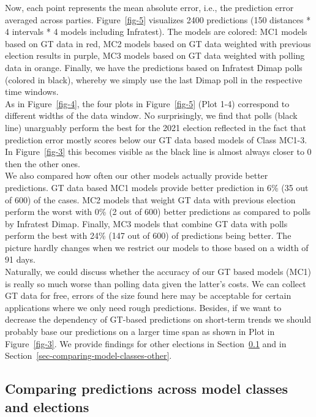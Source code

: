 \documentclass[
  letterpaper,
  DIV=11,
  numbers=noendperiod]{scrartcl}
\begin{document}
Now, each point represents the mean absolute error, i.e., the prediction
error averaged across parties. Figure~\ref{fig-5} visualizes 2400
predictions (150 distances * 4 intervals * 4 models including
Infratest). The models are colored: MC1 models based on GT data in red,
MC2 models based on GT data weighted with previous election results in
purple, MC3 models based on GT data weighted with polling data in
orange. Finally, we have the predictions based on Infratest Dimap polls
(colored in black), whereby we simply use the last Dimap poll in the
respective time windows.\\
As in Figure~\ref{fig-4}, the four plots in Figure~\ref{fig-5} (Plot
1-4) correspond to different widths of the data window. No surprisingly,
we find that polls (black line) unarguably perform the best for the 2021
election reflected in the fact that prediction error mostly scores below
our GT data based models of Class MC1-3. In Figure~\ref{fig-3} this
becomes visible as the black line is almost always closer to 0 then the
other ones.\\
We also compared how often our other models actually provide better
predictions. GT data based MC1 models provide better prediction in 6\%
(35 out of 600) of the cases. MC2 models that weight GT data with
previous election perform the worst with 0\% (2 out of 600) better
predictions as compared to polls by Infratest Dimap. Finally, MC3 models
that combine GT data with polls perform the best with 24\% (147 out of
600) of predictions being better. The picture hardly changes when we
restrict our models to those based on a width of 91 days.\\
Naturally, we could discuss whether the accuracy of our GT based models
(MC1) is really so much worse than polling data given the latter's
costs. We can collect GT data for free, errors of the size found here
may be acceptable for certain applications where we only need rough
predictions. Besides, if we want to decrease the dependency of GT-based
predictions on short-term trends we should probably base our predictions
on a larger time span as shown in Plot in Figure~\ref{fig-3}. We provide
findings for other elections in
Section~\ref{sec-comparison-models-elections} and in
Section~\ref{sec-comparing-model-classes-other}.

\hypertarget{sec-comparison-models-elections}{%
\subsection{Comparing predictions across model classes and
elections}\label{sec-comparison-models-elections}}
\end{document}
